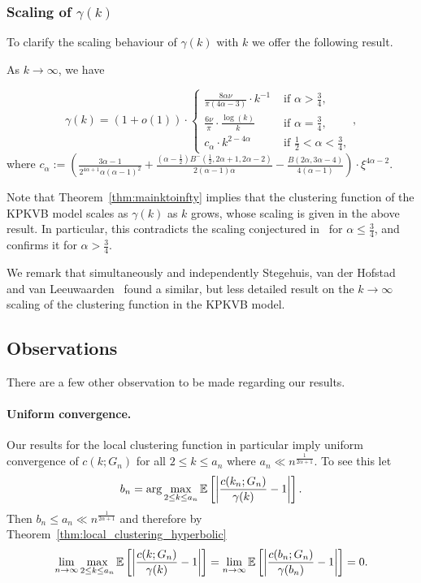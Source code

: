 \subsubsection{Scaling of $\gamma(k)$}

To clarify the scaling behaviour of $\gamma(k)$ with $k$ we offer the following result.

\begin{proposition}\label{prop:asymp}
As $k\to\infty$, we have

$$ \gamma(k) = 
(1+o(1)) \cdot \left\{ \begin{array}{cl}
\frac{8\alpha \nu}{\pi\left(4\alpha - 3\right)} \cdot k^{-1} &\text{ if } \alpha > \frac{3}{4}, \\
\frac{6 \nu}{\pi} \cdot \frac{\log(k)}{k}& \text{ if } \alpha = \frac{3}{4},\\
 c_{\alpha} \cdot k^{2-4\alpha} & \text{ if } \frac12 < \alpha < \frac34, 
\end{array} \right.,
$$
where $c_{\alpha} := \left( \frac{3\alpha - 1}{2^{4\alpha+1}\alpha(\alpha-1)^2} 
	+ \frac{(\alpha - \frac{1}{2})B^-(\frac{1}{2},2\alpha + 1, 2\alpha - 2)}{2(\alpha - 1)\alpha} 
	- \frac{B(2\alpha, 3\alpha - 4)}{4(\alpha - 1)} \right)  \cdot \xi^{4\alpha-2}$.
\end{proposition}

Note that Theorem~\ref{thm:mainktoinfty} implies that the clustering function of the KPKVB model scales as $\gamma(k)$ as $k$ grows, whose scaling is given in the above result. In particular, this contradicts the scaling conjectured in~\cite{krioukov2010hyperbolic} for $\alpha \leq \frac34$, and confirms it for $\alpha > \frac34$.

We remark that simultaneously and independently Stegehuis, van der Hofstad and van Leeuwaarden~\cite{stegehuis2018scale} found a similar, but less detailed result on the $k\to\infty$ scaling of the clustering function in the KPKVB model.

\subsection{Observations}

There are a few other observation to be made regarding our results.

\paragraph{Uniform convergence.}

Our results for the local clustering function in particular imply uniform convergence of $c(k; G_n)$ for all $2 \le k \le a_n$ where $a_n \ll n^{\frac{1}{2\alpha + 1}}$. To see this let
\[
	b_n = \arg \max_{2 \le k \le a_n} \mathbb{E}\left[\left|\frac{c(k_n; G_n)}{\gamma(k)} - 1\right|\right].
\]
Then $b_n \le a_n \ll n^{\frac{1}{2\alpha + 1}}$ and therefore by Theorem~\ref{thm:local_clustering_hyperbolic}
\[
	\lim_{n \to \infty} \max_{2 \le k \le a_n} \mathbb{E}\left[\left|\frac{c(k; G_n)}{\gamma(k)} - 1\right|\right] 
	= \lim_{n \to \infty}\mathbb{E}\left[\left|\frac{c(b_n; G_n)}{\gamma(b_n)} - 1\right|\right] = 0.
\]


